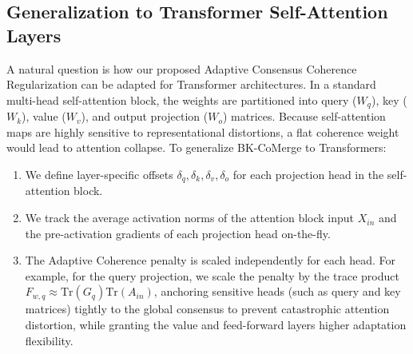 \documentclass{article}
\theoremstyle{plain}
\theoremstyle{definition}
\theoremstyle{remark}
\begin{document}
\subsection{Generalization to Transformer Self-Attention Layers}
A natural question is how our proposed Adaptive Consensus Coherence Regularization can be adapted for Transformer architectures. In a standard multi-head self-attention block, the weights are partitioned into query ($W_q$), key ($W_k$), value ($W_v$), and output projection ($W_o$) matrices.
Because self-attention maps are highly sensitive to representational distortions, a flat coherence weight would lead to attention collapse. To generalize BK-CoMerge to Transformers:
\begin{enumerate}
    \item We define layer-specific offsets $\delta_q, \delta_k, \delta_v, \delta_o$ for each projection head in the self-attention block.
    \item We track the average activation norms of the attention block input $X_{in}$ and the pre-activation gradients of each projection head on-the-fly.
    \item The Adaptive Coherence penalty is scaled independently for each head. For example, for the query projection, we scale the penalty by the trace product $F_{w, q} \approx \text{Tr}(G_q)\text{Tr}(A_{in})$, anchoring sensitive heads (such as query and key matrices) tightly to the global consensus to prevent catastrophic attention distortion, while granting the value and feed-forward layers higher adaptation flexibility.
\end{enumerate}
\end{document}
